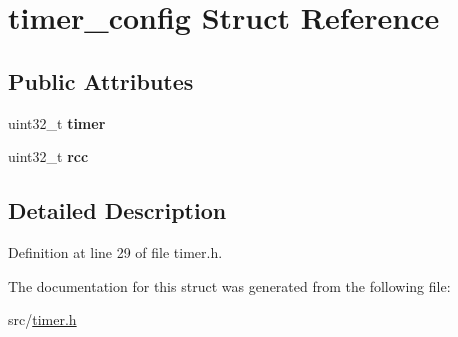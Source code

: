 \hypertarget{structtimer__config}{}\section{timer\+\_\+config Struct Reference}
\label{structtimer__config}
\subsection*{Public Attributes}
\begin{DoxyCompactItemize}
\item 
\hypertarget{structtimer__config_afed1f1ae48fa09893427efa6b8338b65}{}uint32\+\_\+t {\bfseries timer}\label{structtimer__config_afed1f1ae48fa09893427efa6b8338b65}

\item 
\hypertarget{structtimer__config_a1591c4486ebf07c8ac73e69acbbbbc3a}{}uint32\+\_\+t {\bfseries rcc}\label{structtimer__config_a1591c4486ebf07c8ac73e69acbbbbc3a}

\end{DoxyCompactItemize}


\subsection{Detailed Description}


Definition at line 29 of file timer.\+h.



The documentation for this struct was generated from the following file\+:\begin{DoxyCompactItemize}
\item 
src/\hyperlink{timer_8h}{timer.\+h}\end{DoxyCompactItemize}
